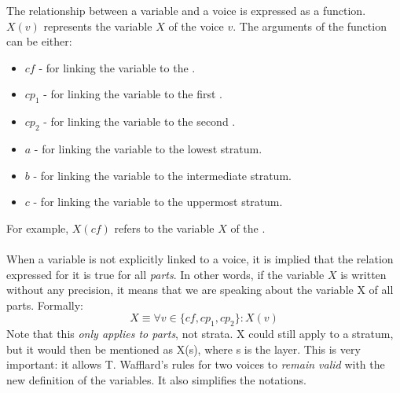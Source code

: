 The relationship between a variable and a voice is expressed as a function. $X(v)$ represents the variable $X$ of the voice $v$. The arguments of the function can be either:
\begin{itemize}
    \item $\mathit{cf}$ - for linking the variable to the \cf.
    \item $cp_1$ - for linking the variable to the first \cp.
    \item $cp_2$ - for linking the variable to the second \cp.
    \item $a$ - for linking the variable to the lowest stratum.
    \item $b$ - for linking the variable to the intermediate stratum.
    \item $c$ - for linking the variable to the uppermost stratum.
  \end{itemize}

\noindent For example, $X(\mathit{cf})$ refers to the variable $X$ of the \cf.

\paragraph{}
When a variable is not explicitly linked to a voice, it is implied that the relation expressed for it is true for all \textit{parts}. In other words, if the variable $X$ is written without any precision, it means that we are speaking about the variable X of all parts. Formally:
\begin{equation}
    X \equiv \forall v \in \{\mathit{cf}, cp_1, cp_2\}: X(v)    
\end{equation}
Note that this \textit{only applies to parts}, not strata. X could still apply to a stratum, but it would then be mentioned as X(s), where s is the layer. 
This is very important: it allows T. Wafflard's rules for two voices to \textit{remain valid} with the new definition of the variables. It also simplifies the notations. 

